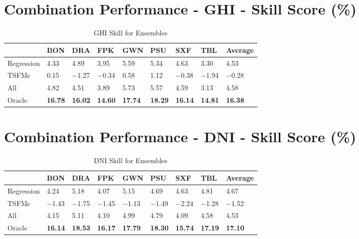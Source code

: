 \vspace{1cm}

\section*{Combination Performance - GHI - Skill Score (\%)}
\begin{table}
\caption{GHI Skill for Ensembles}
\begin{tabular}{lllllllll}
\toprule
 & BON & DRA & FPK & GWN & PSU & SXF & TBL & Average \\
\midrule
Regression & 4.33 & 4.89 & 3.95 & 5.59 & 5.34 & 4.63 & 3.30 & 4.53 \\
TSFMs & 0.15 & $-$1.27 & $-$0.34 & 0.58 & 1.12 & $-$0.38 & $-$1.94 & $-$0.28 \\
All & 4.82 & 4.51 & 3.89 & 5.73 & 5.57 & 4.59 & 3.13 & 4.58 \\
Oracle & \textbf{16.78} & \textbf{16.02} & \textbf{14.60} & \textbf{17.74} & \textbf{18.29} & \textbf{16.14} & \textbf{14.81} & \textbf{16.38} \\
\bottomrule
\end{tabular}
\end{table}

\vspace{1cm}

\section*{Combination Performance - DNI - Skill Score (\%)}
\begin{table}
\caption{DNI Skill for Ensembles}
\begin{tabular}{lllllllll}
\toprule
 & BON & DRA & FPK & GWN & PSU & SXF & TBL & Average \\
\midrule
Regression & 4.24 & 5.18 & 4.07 & 5.15 & 4.69 & 4.63 & 4.81 & 4.67 \\
TSFMs & $-$1.43 & $-$1.75 & $-$1.45 & $-$1.13 & $-$1.49 & $-$2.24 & $-$1.28 & $-$1.52 \\
All & 4.15 & 5.11 & 4.10 & 4.99 & 4.79 & 4.09 & 4.58 & 4.53 \\
Oracle & \textbf{16.14} & \textbf{18.53} & \textbf{16.17} & \textbf{17.79} & \textbf{18.30} & \textbf{15.74} & \textbf{17.19} & \textbf{17.10} \\
\bottomrule
\end{tabular}
\end{table}

\vspace{1cm}

